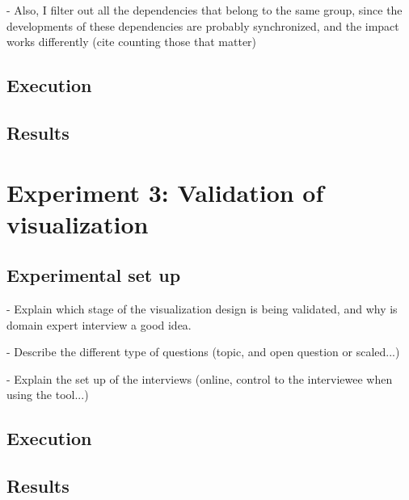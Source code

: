 - Also, I filter out all the dependencies that belong to the same group, since the developments of these dependencies are probably synchronized, and the impact works differently (cite counting those that matter)

\subsection{Execution}
\subsection{Results}



\section{Experiment 3: Validation of visualization}


\subsection{Experimental set up}


- Explain which stage of the visualization design is being validated, and why is domain expert interview a good idea.

- Describe the different type of questions (topic, and open question or scaled...)

- Explain the set up of the interviews (online, control to the interviewee when using the tool...)

\subsection{Execution}
\subsection{Results}
